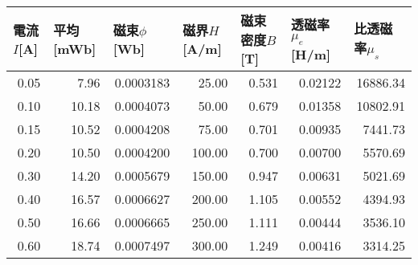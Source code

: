 \begin{tabular}{rrrrrrr}
\toprule
\multicolumn{1}{l}{電流$I$[A]} & \multicolumn{1}{l}{平均[mWb]} & \multicolumn{1}{l}{磁束$\phi$[Wb]} & \multicolumn{1}{l}{磁界$H$[A/m]} & \multicolumn{1}{l}{磁束密度$B$[T]} & \multicolumn{1}{l}{透磁率$\mu_e$[H/m]} & \multicolumn{1}{l}{比透磁率$\mu_s$} \\
\midrule
0.05  & 7.96  & 0.0003183 & 25.00 & 0.531 & 0.02122 & 16886.34 \\
0.10  & 10.18 & 0.0004073 & 50.00 & 0.679 & 0.01358 & 10802.91 \\
0.15  & 10.52 & 0.0004208 & 75.00 & 0.701 & 0.00935 & 7441.73 \\
0.20  & 10.50 & 0.0004200 & 100.00 & 0.700 & 0.00700 & 5570.69 \\
0.30  & 14.20 & 0.0005679 & 150.00 & 0.947 & 0.00631 & 5021.69 \\
0.40  & 16.57 & 0.0006627 & 200.00 & 1.105 & 0.00552 & 4394.93 \\
0.50  & 16.66 & 0.0006665 & 250.00 & 1.111 & 0.00444 & 3536.10 \\
0.60  & 18.74 & 0.0007497 & 300.00 & 1.249 & 0.00416 & 3314.25 \\
\bottomrule
\end{tabular}